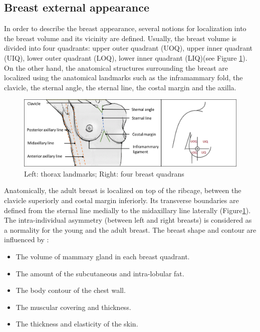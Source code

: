 \subsection{Breast external appearance}\label{subsection:breastappearance}

In order to describe the breast appearance, several notions for localization into the breast volume and its vicinity are defined. Usually, the breast volume is divided into four quadrants: upper outer quadrant (UOQ), upper inner quadrant (UIQ), lower outer quadrant (LOQ), lower inner quadrant (LIQ)(see Figure 	\ref{fig:Breast_quadrants_full}). On the other hand, the anatomical structures surrounding the breast are localized using the anatomical landmarks such as  the inframammary fold, the clavicle, the sternal angle, the sternal line, the costal margin and the axilla.

\begin{figure}[h]
\centering
 \includegraphics[width=\textwidth,keepaspectratio]{figures/Breast_quadrants_full.png}
  \caption{Left: thorax landmarks; Right: four breast quadrans \citep{vandeput2002considerations}}\label{fig:Breast_quadrants_full}
\end{figure}


 Anatomically, the adult breast is localized on top of the ribcage, between the clavicle superiorly and costal margin inferiorly. Its transverse boundaries are defined from the sternal line medially to the midaxillary line laterally (Figure\ref{fig:Breast_quadrants_full}). The intra-individual asymmetry (between left and right breasts) is considered as a normality for the young and the adult breast. The breast shape and contour are influenced by \citep{mugea2014aesthetic}:
 \begin{itemize}
 \item The volume of mammary gland in each breast quadrant.
 \item The amount of the subcutaneous and intra-lobular fat.
 \item The body contour of the chest wall.
 \item The muscular covering and thickness.
 \item The thickness and elasticity of the skin.
 \end{itemize}

